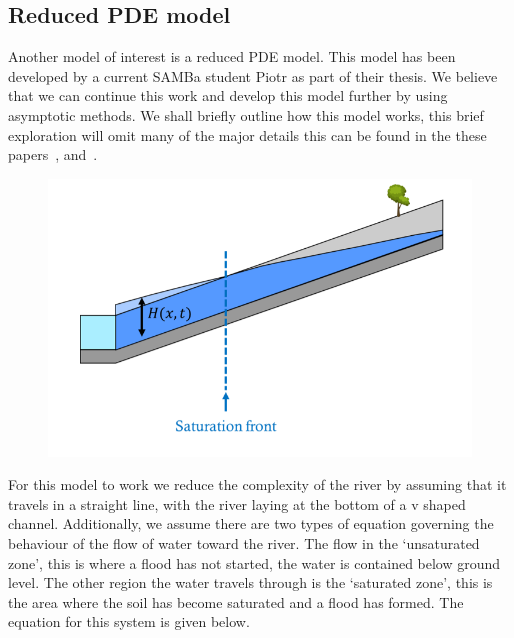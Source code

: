 \documentclass[11pt]{article}
\begin{document}
\subsection{Reduced PDE model}
Another model of interest is a reduced PDE model. This model has been developed by a current SAMBa student Piotr as part of their thesis. 
We believe that we can continue this work and develop this model further by using asymptotic methods.
We shall briefly outline how this model works, this brief exploration will omit many of the major details this can be found in the these papers~\cite{pp1},\cite{pp2} and~\cite{pp3}.

\vspace{5pt}
\begin{minipage}{0.6\textwidth}
    \begin{figure}[H]%
    \centering
    \includegraphics[width=\textwidth]{Figs/Simple model.png}
    \label{fig:model}
    \end{figure}
\end{minipage}
\hspace{0.05\textwidth}
\begin{minipage}{0.3\textwidth}
    \qquad For this model to work we reduce the complexity of the river by assuming that it travels in a straight line, with the river laying at the bottom of a v shaped channel. Additionally, we assume there are two types of equation governing the behaviour of the flow of water toward the river. 
    The flow in the `unsaturated zone', this is where a flood has not started, the water is contained below ground level. The other region the water travels through is the `saturated zone', this is the area where the soil has become saturated and a flood has formed. The equation for this system is given below.
    
\end{minipage}
\end{document}
